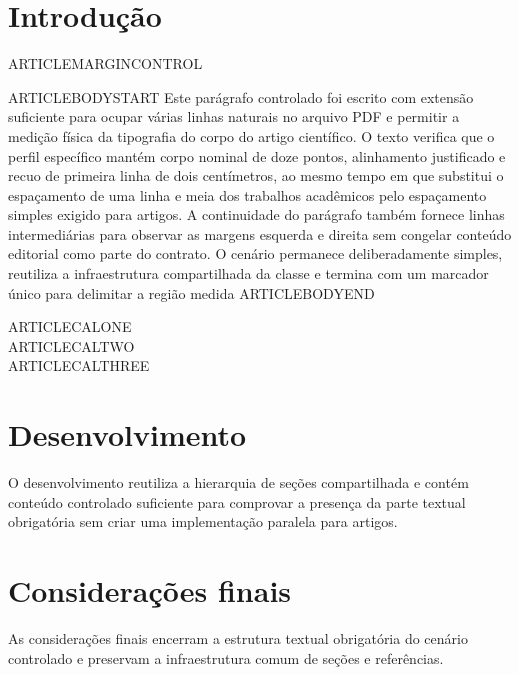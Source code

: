 \documentclass{abntexto-ufc}
\begin{document}

\section{Introdução}

\noindent ARTICLEMARGINCONTROL

ARTICLEBODYSTART Este parágrafo controlado foi escrito com extensão suficiente para ocupar várias linhas naturais no arquivo PDF e permitir a medição física da tipografia do corpo do artigo científico. O texto verifica que o perfil específico mantém corpo nominal de doze pontos, alinhamento justificado e recuo de primeira linha de dois centímetros, ao mesmo tempo em que substitui o espaçamento de uma linha e meia dos trabalhos acadêmicos pelo espaçamento simples exigido para artigos. A continuidade do parágrafo também fornece linhas intermediárias para observar as margens esquerda e direita sem congelar conteúdo editorial como parte do contrato. O cenário permanece deliberadamente simples, reutiliza a infraestrutura compartilhada da classe e termina com um marcador único para delimitar a região medida ARTICLEBODYEND

\par\medskip
\begingroup
\singlesp
\noindent ARTICLECALONE\\
ARTICLECALTWO\\
ARTICLECALTHREE\par
\endgroup

\section{Desenvolvimento}

O desenvolvimento reutiliza a hierarquia de seções compartilhada e contém conteúdo controlado suficiente para comprovar a presença da parte textual obrigatória sem criar uma implementação paralela para artigos.

\section{Considerações finais}

As considerações finais encerram a estrutura textual obrigatória do cenário controlado e preservam a infraestrutura comum de seções e referências.

\nocite{silva2020}
\ufcPrintReferences
\end{document}
